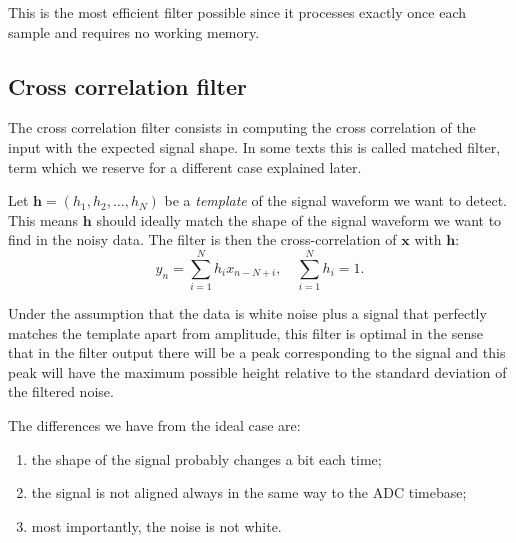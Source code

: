 This is the most efficient filter possible since it processes exactly once each
sample and requires no working memory.

\subsection{Cross correlation filter}

\begin{figure}
    
    

\end{figure}

The cross correlation filter consists in computing the cross correlation of
the input with the expected signal shape. In some texts this is called matched
filter, term which we reserve for a different case explained later.

Let $\mathbf h = (h_1, h_2, \ldots, h_N)$ be a \emph{template} of the signal
waveform we want to detect. This means $\mathbf h$ should ideally match the
shape of the signal waveform we want to find in the noisy data. The filter is
then the cross-correlation of $\mathbf x$ with $\mathbf h$:
%
\begin{equation}
    y_n = \sum_{i=1}^N h_i x_{n-N+i}, \quad \sum_{i=1}^N h_i = 1.
\end{equation}

Under the assumption that the data is white noise plus a signal that perfectly
matches the template apart from amplitude, this filter is optimal in the sense
that in the filter output there will be a peak corresponding to the signal and
this peak will have the maximum possible height relative to the standard
deviation of the filtered noise.

The differences we have from the ideal case are:
%
\begin{enumerate}
    \item the shape of the signal probably changes a bit each time;
    \item the signal is not aligned always in the same way to the ADC timebase;
    \item most importantly, the noise is not white.
\end{enumerate}

